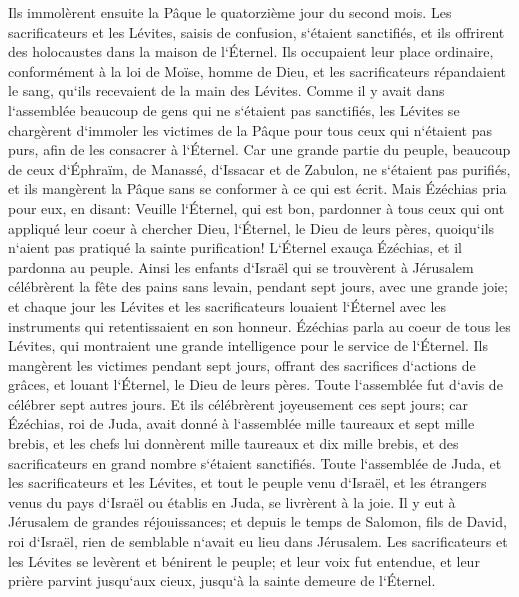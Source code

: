 \verse Ils immolèrent ensuite la Pâque le quatorzième jour du second mois. Les sacrificateurs et les Lévites, saisis de confusion, s`étaient sanctifiés, et ils offrirent des holocaustes dans la maison de l`Éternel. 
\verse Ils occupaient leur place ordinaire, conformément à la loi de Moïse, homme de Dieu, et les sacrificateurs répandaient le sang, qu`ils recevaient de la main des Lévites. 
\verse Comme il y avait dans l`assemblée beaucoup de gens qui ne s`étaient pas sanctifiés, les Lévites se chargèrent d`immoler les victimes de la Pâque pour tous ceux qui n`étaient pas purs, afin de les consacrer à l`Éternel. 
\verse Car une grande partie du peuple, beaucoup de ceux d`Éphraïm, de Manassé, d`Issacar et de Zabulon, ne s`étaient pas purifiés, et ils mangèrent la Pâque sans se conformer à ce qui est écrit. Mais Ézéchias pria pour eux, en disant: Veuille l`Éternel, qui est bon, 
\verse pardonner à tous ceux qui ont appliqué leur coeur à chercher Dieu, l`Éternel, le Dieu de leurs pères, quoiqu`ils n`aient pas pratiqué la sainte purification! 
\verse L`Éternel exauça Ézéchias, et il pardonna au peuple. 
\verse Ainsi les enfants d`Israël qui se trouvèrent à Jérusalem célébrèrent la fête des pains sans levain, pendant sept jours, avec une grande joie; et chaque jour les Lévites et les sacrificateurs louaient l`Éternel avec les instruments qui retentissaient en son honneur. 
\verse Ézéchias parla au coeur de tous les Lévites, qui montraient une grande intelligence pour le service de l`Éternel. Ils mangèrent les victimes pendant sept jours, offrant des sacrifices d`actions de grâces, et louant l`Éternel, le Dieu de leurs pères. 
\verse Toute l`assemblée fut d`avis de célébrer sept autres jours. Et ils célébrèrent joyeusement ces sept jours; 
\verse car Ézéchias, roi de Juda, avait donné à l`assemblée mille taureaux et sept mille brebis, et les chefs lui donnèrent mille taureaux et dix mille brebis, et des sacrificateurs en grand nombre s`étaient sanctifiés. 
\verse Toute l`assemblée de Juda, et les sacrificateurs et les Lévites, et tout le peuple venu d`Israël, et les étrangers venus du pays d`Israël ou établis en Juda, se livrèrent à la joie. 
\verse Il y eut à Jérusalem de grandes réjouissances; et depuis le temps de Salomon, fils de David, roi d`Israël, rien de semblable n`avait eu lieu dans Jérusalem. 
\verse Les sacrificateurs et les Lévites se levèrent et bénirent le peuple; et leur voix fut entendue, et leur prière parvint jusqu`aux cieux, jusqu`à la sainte demeure de l`Éternel. 

